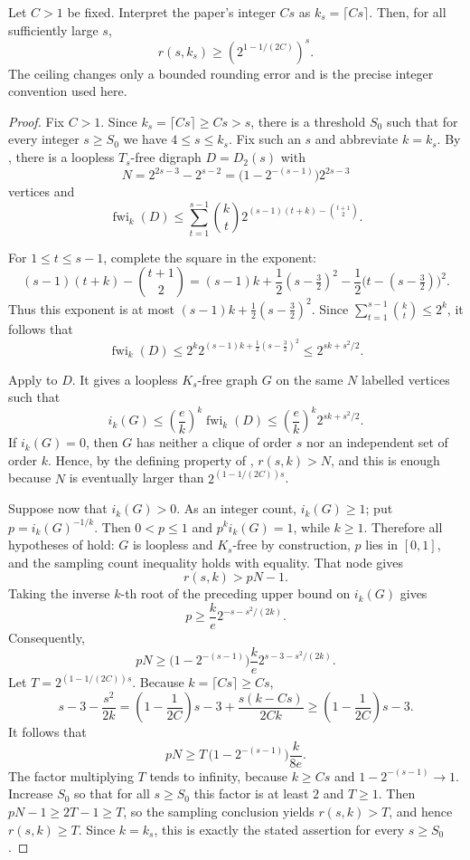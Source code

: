 \begin{theorem}
Let $C>1$ be fixed.  Interpret the paper's integer $Cs$ as
$k_s=\lceil Cs\rceil$.  Then, for all sufficiently large $s$,
\[
 r(s,k_s)\geq\left(2^{1-1/(2C)}\right)^s.
\]
The ceiling changes only a bounded rounding error and is the precise integer
convention used here.
\end{theorem}
\begin{proof}
Fix $C>1$.  Since $k_s=\lceil Cs\rceil\geq Cs>s$, there is a threshold
$S_0$ such that for every integer $s\geq S_0$ we have $4\leq s\leq
k_s$.  Fix such an $s$ and abbreviate $k=k_s$.  By
, there is a loopless $T_s$-free digraph
$D=D_2(s)$ with
\[
N=2^{2s-3}-2^{s-2}
  =\bigl(1-2^{-(s-1)}\bigr)2^{2s-3}
\]
vertices and
\[
 \operatorname{fwi}_k(D)\leq
 \sum_{t=1}^{s-1}\binom kt
 2^{(s-1)(t+k)-\binom{t+1}{2}}.
\]

For $1\leq t\leq s-1$, complete the square in the exponent:
\[
(s-1)(t+k)-\binom{t+1}{2}
 = (s-1)k+\frac12(s-\tfrac32)^2
   -\frac12\bigl(t-(s-\tfrac32)\bigr)^2.
\]
Thus this exponent is at most $(s-1)k+\frac12(s-\tfrac32)^2$.
Since $\sum_{t=1}^{s-1}\binom kt\leq2^k$, it follows that
\[
 \operatorname{fwi}_k(D)\leq
 2^k2^{(s-1)k+\frac12(s-\frac32)^2}
 \leq 2^{sk+s^2/2}.
\]

Apply  to $D$.  It gives a loopless
$K_s$-free graph $G$ on the same $N$ labelled vertices such that
\[
i_k(G)\leq\left(\frac ek\right)^k\operatorname{fwi}_k(D)
 \leq\left(\frac ek\right)^k2^{sk+s^2/2}.
\]
If $i_k(G)=0$, then $G$ has neither a clique of order $s$ nor an
independent set of order $k$.  Hence, by the defining property of
, $r(s,k)>N$, and this is enough because $N$ is
eventually larger than $2^{(1-1/(2C))s}$.

Suppose now that $i_k(G)>0$.  As an integer count, $i_k(G)\geq1$; put
$p=i_k(G)^{-1/k}$.  Then $0<p\leq1$ and $p^ki_k(G)=1$, while $k\geq1$.
Therefore all hypotheses of  hold: $G$ is
loopless and $K_s$-free by construction, $p$ lies in $[0,1]$, and the
sampling count inequality holds with equality.  That node gives
\[
r(s,k)>pN-1.
\]
Taking the inverse $k$-th root of the preceding upper bound on $i_k(G)$
gives
\[
p\geq \frac{k}{e}2^{-s-s^2/(2k)}.
\]
Consequently,
\[
pN\geq
\bigl(1-2^{-(s-1)}\bigr)\frac{k}{e}
 2^{s-3-s^2/(2k)}.
\]
Let $T=2^{(1-1/(2C))s}$.  Because $k=\lceil Cs\rceil\geq Cs$,
\[
s-3-\frac{s^2}{2k}
 =\left(1-\frac1{2C}\right)s-3
   +\frac{s(k-Cs)}{2Ck}
 \geq\left(1-\frac1{2C}\right)s-3.
\]
It follows that
\[
pN\geq
T\,\bigl(1-2^{-(s-1)}\bigr)\frac{k}{8e}.
\]
The factor multiplying $T$ tends to infinity, because $k\geq Cs$ and
$1-2^{-(s-1)}\to1$.  Increase $S_0$ so that for all $s\geq S_0$ this
factor is at least $2$ and $T\geq1$.  Then $pN-1\geq2T-1\geq T$, so the
sampling conclusion yields $r(s,k)>T$, and hence $r(s,k)\geq T$.
Since $k=k_s$, this is exactly the stated assertion for every $s\geq S_0$.
\end{proof}
